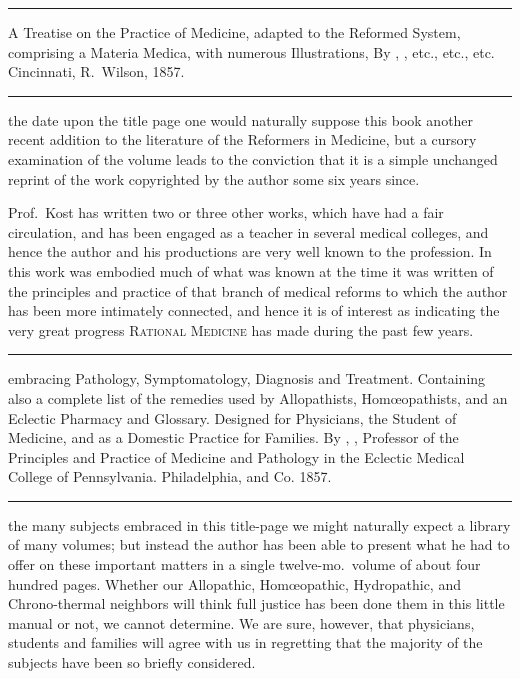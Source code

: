 
\fancybreak{* * *}

\footnotesize
{}  A Treatise on the Practice of Medicine, adapted to the Reformed
System, comprising a Materia Medica, with numerous Illustrations, By , \md, etc., etc., etc. Cincinnati, R.~Wilson, 1857.
\plainbreak{1}
\normalsize

 the date upon the title page one would naturally suppose this
book another recent addition to the literature of the Reformers in Medicine,
but a cursory examination of the volume leads to the conviction
that it is a simple unchanged reprint of the work copyrighted by the
author some six years since.

Prof.\ Kost has written two or three other works, which have had
a fair circulation, and has been engaged as a teacher in several
medical colleges, and hence the author and his productions are very
well known to the profession. In this work was embodied much of what
was known at the time it was written of the principles and practice of
that branch of medical reforms to which the author has been more intimately
connected, and hence it is of interest as indicating the very
great progress \textsc{Rational Medicine} has made during the past few years.

\fancybreak{* * *}

\footnotesize
{} embracing Pathology, Symptomatology,
Diagnosis and Treatment. Containing also a complete list of the remedies used
by Allopathists, Homœopathists, and an Eclectic Pharmacy and Glossary. Designed
for Physicians, the Student of Medicine, and as a Domestic Practice for Families. By
, \md, Professor of the Principles and Practice of Medicine and Pathology
in the Eclectic Medical College of Pennsylvania. Philadelphia, 
and Co. 1857.
\plainbreak{1}
\normalsize

 the many subjects embraced in this title-page we might naturally
expect a library of many volumes; but instead the author has been
able to present what he had to offer on these important matters in a
single twelve-mo.\ volume of about four hundred pages. Whether our
Allopathic, Homœopathic, Hydropathic, and Chrono-thermal neighbors
will think full justice has been done them in this little manual or not,
we cannot determine. We are sure, however, that physicians, students
and families will agree with us in regretting that the majority of the
subjects have been so briefly considered.

